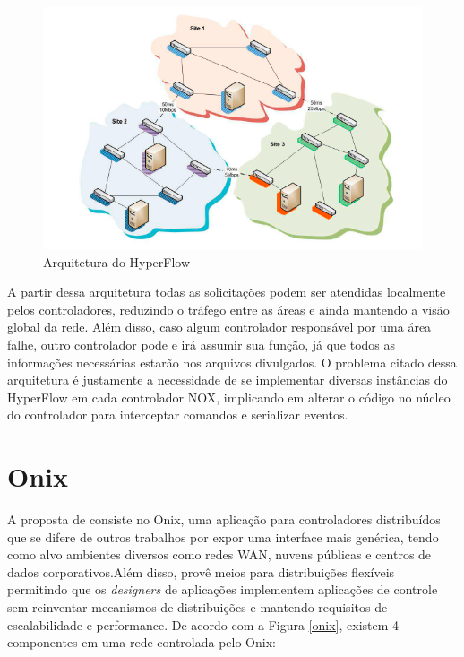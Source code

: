 \pagebreak
\begin{figure}[!h]
	\caption{ Arquitetura do HyperFlow}
  \centering
  \includegraphics[scale=1]{Imagens/hiperflow.PNG} 
 
  \label{hyperflow}
\end{figure}

\par A partir dessa arquitetura todas as solicitações podem ser atendidas localmente pelos controladores, reduzindo o tráfego entre as áreas e ainda mantendo a visão global da rede. Além disso, caso algum controlador responsável por uma área falhe, outro controlador pode e irá assumir sua função, já que todos as informações necessárias estarão nos arquivos divulgados. O problema citado dessa arquitetura é justamente a necessidade de se implementar diversas instâncias do HyperFlow em cada controlador NOX, implicando em alterar o código no núcleo do controlador para interceptar comandos e serializar eventos.

\section{Onix}

A proposta de  consiste no Onix, uma aplicação para controladores distribuídos que se difere de outros trabalhos por expor uma interface mais genérica, tendo como alvo ambientes diversos como redes WAN, nuvens públicas e centros de dados corporativos.Além disso, provê meios para distribuições flexíveis permitindo que os \emph{designers} de aplicações implementem aplicações de controle sem reinventar mecanismos de distribuições e mantendo requisitos de escalabilidade e performance. De acordo com a Figura \ref{onix}, existem 4 componentes em uma rede controlada pelo Onix:

